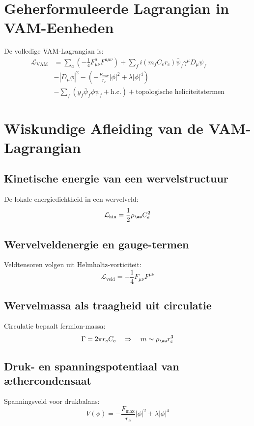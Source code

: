 \documentclass{article}
\begin{document}
    \section{Geherformuleerde Lagrangian in VAM-Eenheden}
    De volledige VAM-Lagrangian is:
    \begin{align*}
        \mathcal{L}_\text{VAM} &= \sum_{a}\left(-\frac{1}{4} F^{a}_{\mu\nu} F^{a\mu\nu}\right)
        + \sum_{f} i(m_f C_e r_c)\bar{\psi}_f \gamma^\mu D_\mu \psi_f \\
        &- \left| D_\mu \phi \right|^2
        - \left(-\frac{F_\text{max}}{r_c}|\phi|^2 + \lambda|\phi|^4\right) \\
        &- \sum_f \left(y_f \bar{\psi}_f \phi \psi_f + \text{h.c.}\right)
        + \text{topologische heliciteitstermen}
    \end{align*}

    \section{Wiskundige Afleiding van de VAM-Lagrangian}

    \subsection{Kinetische energie van een wervelstructuur}
    De lokale energiedichtheid in een wervelveld:
    \[
        \mathcal{L}_\text{kin} = \frac{1}{2}\rho_{\ae} C_e^2
    \]

    \subsection{Wervelveldenergie en gauge-termen}
    Veldtensoren volgen uit Helmholtz-vorticiteit:
    \[
        \mathcal{L}_\text{veld} = -\frac{1}{4}F_{\mu\nu}F^{\mu\nu}
    \]

    \subsection{Wervelmassa als traagheid uit circulatie}
    Circulatie bepaalt fermion-massa:
    \[
        \Gamma = 2\pi r_c C_e \quad\Rightarrow\quad m \sim \rho_{\ae} r_c^3
    \]

    \subsection{Druk- en spanningspotentiaal van æthercondensaat}
    Spanningsveld voor drukbalans:
    \[
        V(\phi) = -\frac{F_\text{max}}{r_c}|\phi|^2 + \lambda|\phi|^4
    \]
\end{document}

